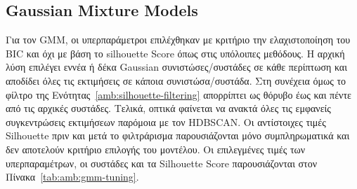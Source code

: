 \begin{table}[htbp]
    \centering
    \caption{Επιλεγμένες ρυθμίσεις HDBSCAN.}
    \label{tab:amb:hdbscan-tuning}
\end{table}

\subsection{Gaussian Mixture Models}

Για τον GMM, οι υπερπαράμετροι επιλέχθηκαν με κριτήριο την
ελαχιστοποίηση του BIC και όχι με βάση το silhouette Score όπως στις υπόλοιπες μεθόδους. Η αρχική λύση
επιλέγει εννέα ή δέκα Gaussian συνιστώσες/συστάδες σε κάθε περίπτωση και αποδίδει όλες τις εκτιμήσεις
σε κάποια συνιστώσα/συστάδα. Στη συνέχεια όμως το φίλτρο της Ενότητας~\ref{amb:silhouette-filtering} απορρίπτει ως θόρυβο έως και πέντε από τις αρχικές συστάδες. Τελικά, οπτικά φαίνεται να ανακτά όλες τις εμφανείς συγκεντρώσεις εκτιμήσεων παρόμοια με τον HDBSCAN. Οι αντίστοιχες τιμές Silhouette πριν και μετά το φιλτράρισμα παρουσιάζονται μόνο συμπληρωματικά και δεν αποτελούν κριτήριο επιλογής του μοντέλου. Οι επιλεγμένες τιμές των υπερπαραμέτρων, οι συστάδες και τα Silhouette Score παρουσιάζονται στον Πίνακα~\ref{tab:amb:gmm-tuning}.

